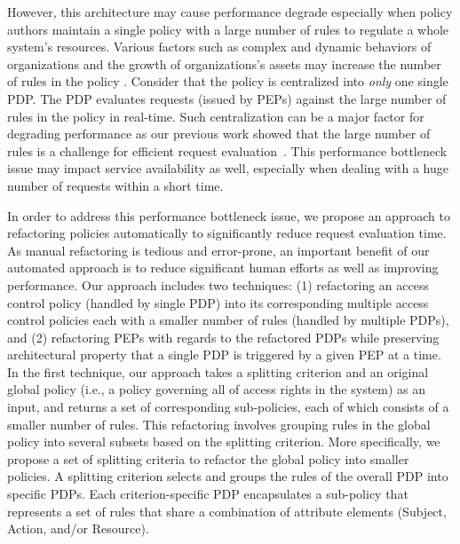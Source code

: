 However, this architecture may cause performance degrade
especially when policy authors maintain a single policy with a large number of rules to regulate a whole system's resources.
Various factors such as complex and dynamic behaviors of organizations and the growth of organizations's assets may increase the
number of rules in the policy \cite{policymanagement}.
Consider that the policy is centralized into \emph{only} one single PDP.
The PDP evaluates requests (issued by PEPs) against
the large number of rules in the policy in real-time.
Such centralization can be a major factor for degrading performance as our previous work showed that the large number of rules is a challenge for efficient request evaluation~\cite{Xengine}.
This performance bottleneck issue may impact service
availability as well, especially when dealing with a huge number of requests within a short time.


In order to address this performance bottleneck issue,
we propose an approach to refactoring policies automatically to significantly reduce
request evaluation time.
As manual refactoring is tedious and
error-prone, an important benefit of our automated approach is to reduce significant human efforts as well as
improving performance.
Our approach includes two techniques: (1) refactoring an access control policy (handled by single PDP) into its corresponding multiple access
control policies each with a smaller number of rules (handled by multiple PDPs),
and (2) refactoring PEPs with regards to the refactored PDPs while preserving architectural property that a single PDP is triggered by a given PEP at a time.\\

In the first technique, our approach takes a splitting criterion and an original global policy (i.e., a policy governing all of access rights in the system) as an input, and returns a set of
corresponding sub-policies, each of which consists of a smaller number of rules.
This refactoring involves grouping rules in the global policy into several subsets based on the splitting criterion.
More specifically, we propose a set of splitting criteria to
refactor the global policy into smaller policies.
A splitting criterion selects and groups the rules of the overall PDP into specific PDPs.
Each criterion-specific PDP encapsulates a sub-policy that represents a set of rules that share a combination
of attribute elements (Subject, Action, and/or Resource).

